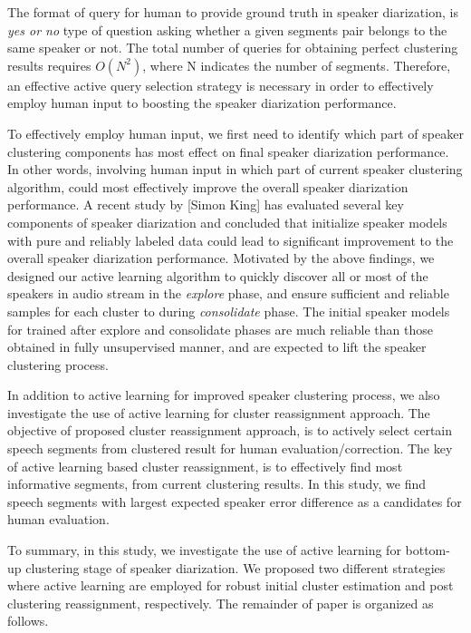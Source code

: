 \documentclass[final,authoryear,5p,times,twocolumn]{elsarticle}
\begin{document}
The format of query for human to provide ground truth in speaker diarization, is \textit{yes or no} type of question asking whether a given segments pair belongs to the same speaker or not. The total number of queries for obtaining perfect clustering results requires $O(N^{2})$, where N indicates the number of segments. Therefore, an effective active query selection strategy is necessary in order to effectively employ human input to boosting the speaker diarization performance. 

To effectively employ human input, we first need to identify which part of speaker clustering components has most effect on final speaker diarization performance. In other words, involving human input in which part of current speaker clustering algorithm, could most effectively improve the overall speaker diarization performance. A recent study by [Simon King] has evaluated several key components of speaker diarization and concluded that initialize speaker models with pure and reliably labeled data could lead to significant improvement to the overall speaker diarization performance.   Motivated by the above findings, we designed our active learning algorithm to quickly discover all or most of the speakers in audio stream in the \textit{explore} phase, and ensure sufficient and reliable samples for each cluster to during \textit{consolidate} phase. The initial speaker models for trained after explore and consolidate phases are much reliable than those obtained in fully unsupervised manner, and are expected to lift the speaker clustering process.

In addition to active learning for improved speaker clustering process, we also investigate the use of active learning for cluster reassignment approach. The objective of proposed cluster reassignment approach, is to actively select certain speech segments from clustered result for human evaluation/correction. The key of active learning based cluster reassignment, is to effectively find most informative segments, from current clustering results. In this study, we find speech segments with largest expected speaker error difference as a candidates for human evaluation.

To summary, in this study, we investigate the use of active learning for bottom-up clustering stage of speaker diarization. We proposed two different strategies where active learning are employed for robust initial cluster estimation and post clustering reassignment, respectively. The remainder of paper is organized as follows.   
\end{document}
